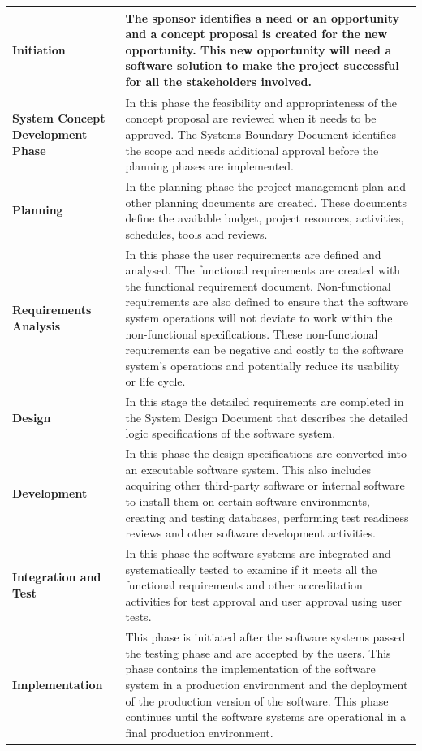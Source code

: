 \begin{xltabular}{\textwidth}{|l|X|}
	\textbf{Initiation} & The sponsor identifies a need or an opportunity and a concept proposal is created for the new opportunity. This new opportunity will need a software solution to make the project successful for all the stakeholders involved.\\ \hline
	\textbf{System Concept Development Phase} & In this phase the feasibility and appropriateness of the concept proposal are reviewed when it needs to be approved. The Systems Boundary Document identifies the scope and needs additional approval before the planning phases are implemented.   \\ \hline
	\textbf{Planning} & In the planning phase the project management plan and other planning documents are created. These documents define the available budget, project resources, activities, schedules, tools and reviews.  \\ \hline
	\textbf{Requirements Analysis} & In this phase the user requirements are defined and analysed. The functional requirements are created with the functional requirement document. Non-functional requirements are also defined to ensure that the software system operations will not deviate to work within the non-functional specifications. These non-functional requirements can be negative and costly to the software system's operations and potentially reduce its usability or life cycle. \\ \hline
	\textbf{Design} & In this stage the detailed requirements are completed in the System Design Document that describes the detailed logic specifications of the software system. \\ \hline
	\textbf{Development} & In this phase the design specifications are converted into an executable software system. This also includes acquiring other third-party software or internal software to install them on certain software environments, creating and testing databases, performing test readiness reviews and other software development activities. \\ \hline
	\textbf{Integration and Test} & In this phase the software systems are integrated and systematically tested to examine if it meets all the functional requirements and other accreditation activities for test approval and user approval using user tests.  \\ \hline
	\textbf{Implementation} & This phase is initiated after the software systems passed the testing phase and are accepted by the users. This phase contains the implementation of the software system in a production environment and the deployment of the production version of the software. This phase continues until the software systems are operational in a final production environment.\\ \hline

\end{xltabular}
